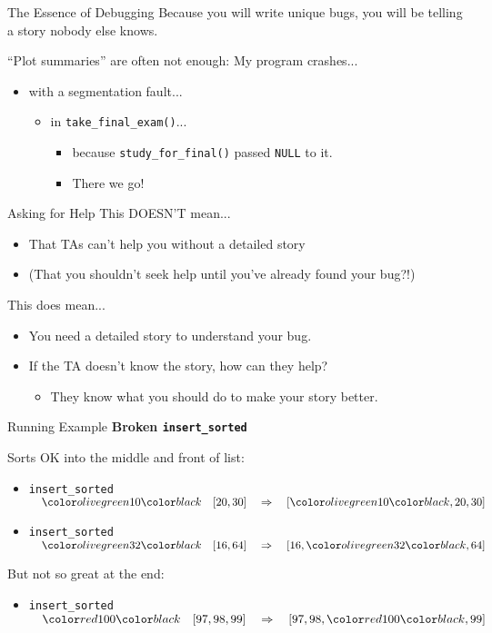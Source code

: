 \documentclass[xcolor=dvipsnames]{beamer}
\begin{document}
\begin{frame}{The Essence of Debugging}
	Because you will write unique bugs, you will be telling a story nobody else knows.

	\linegap
	``Plot summaries'' are often not enough: My program crashes...
	\pause
	\begin{itemize}
		\item with a segmentation fault...
		\pause
		\begin{itemize}
			\item in \texttt{take\_final\_exam()}...
			\pause
			\begin{itemize}
				\item because \texttt{study\_for\_final()} passed \texttt{NULL} to it.
				\item There we go!
			\end{itemize}
		\end{itemize}
	\end{itemize}
\end{frame}

\begin{frame}{Asking for Help}
	This DOESN'T mean...
	\begin{itemize}
		\item That TAs can't help you without a detailed story
		\item (That you shouldn't seek help until you've already found your bug?!)
	\end{itemize}
	\pause
	This does mean...
	\begin{itemize}
		\item You need a detailed story to understand your bug.
		\item If the TA doesn't know the story, how can they help?
		\pause
		\begin{itemize}
			\item They know what you should do to make your story better.
		\end{itemize}
	\end{itemize}
\end{frame}

\begin{frame}{Running Example}
	\textbf{Broken \texttt{insert\_sorted}}

	\linegap
	Sorts OK into the middle and front of list:
	\begin{itemize}
		\item \texttt{insert\_sorted} $\quad \hilight{olivegreen}{10} \quad  [20,30] \quad \Rightarrow \quad [\hilight{olivegreen}{10},20,30]$
		\item \texttt{insert\_sorted} $\quad \hilight{olivegreen}{32} \quad  [16,64] \quad \Rightarrow \quad [16,\hilight{olivegreen}{32},64]$
	\end{itemize}

	\linegap
	But not so great at the end:
	\begin{itemize}
	\item \texttt{insert\_sorted} $\quad \hilight{red}{100}  \quad [97,98,99] \quad \Rightarrow \quad [97,98,\hilight{red}{100},99]$
	\end{itemize}
\end{frame}
\end{document}
